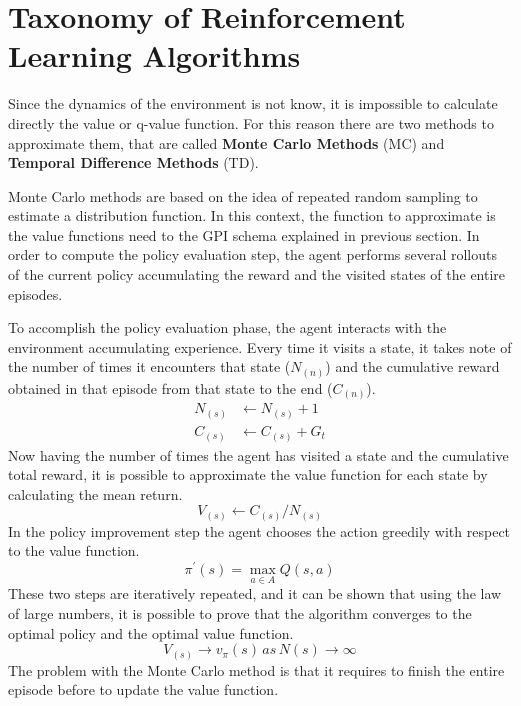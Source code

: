 \section{Taxonomy of Reinforcement Learning Algorithms}
\label{taxonomy}
Since the dynamics of the environment is not know, it is impossible to calculate directly the value or q-value function. 
For this reason there are two methods to approximate them, that are called \textbf{Monte Carlo Methods} (MC) and \textbf{Temporal Difference Methods} (TD).

Monte Carlo methods are based on the idea of repeated random sampling to estimate a distribution function. 
In this context, the function to approximate is the value functions need to the GPI schema explained in previous section.
In order to compute the policy evaluation step, the agent performs several rollouts of the current policy accumulating the reward and the visited states of the entire episodes. 

To accomplish the policy evaluation phase, the agent interacts with the environment accumulating experience.
Every time it visits a state, it takes note of the number of times it encounters that state ($N_ {(n)}$) and the cumulative reward obtained in that episode from that state to the end ($C_ {(n)}$).
\begin{align*}
N_{(s)} &\leftarrow N_{(s)}+1 \\
C_{(s)} &\leftarrow C_{(s)} + G_t
\end{align*}
Now having the number of times the agent has visited a state and the cumulative total reward, it is possible to approximate the value function for each state by calculating the mean return.
\begin{equation*}
V_{(s)} \leftarrow C_{(s)}/N_{(s)}
\end{equation*}
In the policy improvement step the agent chooses the action greedily with respect to the value function.
\begin{equation*}
\pi^{'}(s) = \underset{a\in A} 	\max Q(s,a)
\end{equation*}
These two steps are iteratively repeated, and it can be shown that using the law of large numbers, it is possible to prove that the algorithm converges to the optimal policy and the optimal value function.
\begin{equation*}
V_{(s)} \rightarrow v_\pi(s) \, as \, N(s) \rightarrow \infty
\end{equation*}
The problem with the Monte Carlo method is that it requires to finish the entire episode before to update the value function.

